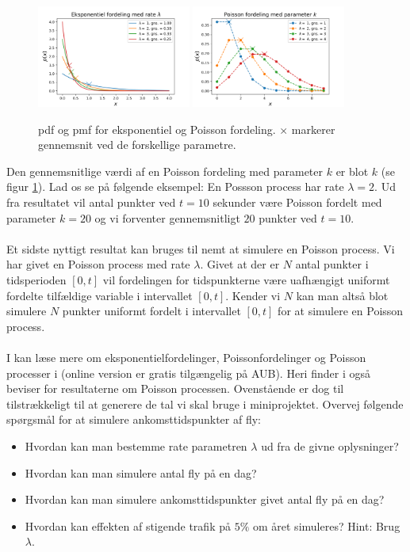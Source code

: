 \documentclass{article}
\begin{document}
\begin{figure}
\centering
\includegraphics[width = 0.45\textwidth]{exp_dist.png}
\includegraphics[width = 0.45\textwidth]{poiss_dist.png}
\caption{pdf og pmf for eksponentiel og Poisson fordeling. $\times$ markerer gennemsnit ved de forskellige parametre.} \label{fig:distributions}
\end{figure}
Den gennemsnitlige værdi af en Poisson fordeling med parameter $k$ er blot $k$ (se figur \ref{fig:distributions}). Lad os se på følgende eksempel: En Possson process har rate $\lambda = 2$. Ud fra resultatet vil antal punkter ved $t = 10$ sekunder være Poisson fordelt med parameter $k = 20$ og vi forventer gennemsnitligt $20$ punkter ved $t = 10$. 
\\ \\
Et sidste nyttigt resultat kan bruges til nemt at simulere en Poisson process. Vi har givet en Poisson process med rate $\lambda$. Givet at der er $N$ antal punkter i tidsperioden $[0,t]$ vil fordelingen for tidspunkterne være uafhængigt uniformt fordelte tilfældige variable i intervallet $[0,t]$. Kender vi $N$ kan man altså blot simulere $N$ punkter uniformt fordelt i intervallet $[0,t]$ for at simulere en Poisson process.
\\ \\
I kan læse mere om eksponentielfordelinger, Poissonfordelinger og Poisson processer i \cite{olofsson2012} (online version er gratis tilgængelig på AUB). Heri finder i også beviser for resultaterne om Poisson processen. Ovenstående er dog til tilstrækkeligt til at generere de tal vi skal bruge i miniprojektet. Overvej følgende spørgsmål for at simulere ankomsttidspunkter af fly: 
\begin{itemize}
\item Hvordan kan man bestemme rate parametren $\lambda$ ud fra de givne oplysninger? 
\item Hvordan kan man simulere antal fly på en dag?
\item Hvordan kan man simulere ankomsttidspunkter givet antal fly på en dag?  
\item Hvordan kan effekten af stigende trafik på $5\%$ om året simuleres? Hint: Brug $\lambda$. 
\end{itemize}
\end{document}

